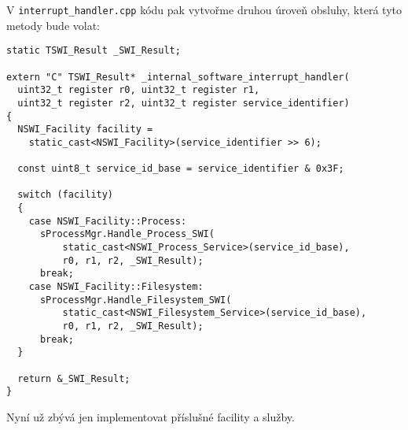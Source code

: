 \documentclass{article}
\begin{document}
V \texttt{interrupt\_handler.cpp} kódu pak vytvořme druhou úroveň obsluhy, která tyto metody bude volat:

\begin{lstlisting}
static TSWI_Result _SWI_Result;

extern "C" TSWI_Result* _internal_software_interrupt_handler(
  uint32_t register r0, uint32_t register r1,
  uint32_t register r2, uint32_t register service_identifier)
{
  NSWI_Facility facility =
    static_cast<NSWI_Facility>(service_identifier >> 6);
    
  const uint8_t service_id_base = service_identifier & 0x3F;
	
  switch (facility)
  {
    case NSWI_Facility::Process:
      sProcessMgr.Handle_Process_SWI(
          static_cast<NSWI_Process_Service>(service_id_base),
          r0, r1, r2, _SWI_Result);
      break;
    case NSWI_Facility::Filesystem:
      sProcessMgr.Handle_Filesystem_SWI(
          static_cast<NSWI_Filesystem_Service>(service_id_base),
          r0, r1, r2, _SWI_Result);
      break;
  }
	
  return &_SWI_Result;
}
\end{lstlisting}
Nyní už zbývá jen implementovat příslušné facility a služby.
\end{document}
